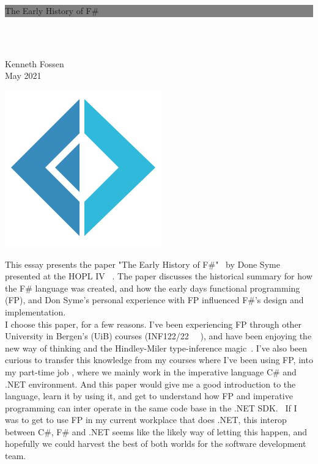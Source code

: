 \documentclass[12pt]{article}
\begin{document}
	\colorbox{grey}{
		\parbox[t]{0.93\textwidth}{ %
			\parbox[t]{0.91\textwidth}{ %
				\raggedleft %
				\fontsize{50pt}{80pt}\selectfont %
				\vspace{0.7cm} %
				
			    The Early History of F\#\\
			   
				\vspace{0.7cm} %
			}
		}
	}
\\\\
\parbox[t]{0.93\textwidth}{
    \raggedleft
    Kenneth Fossen\\
    May 2021
}


\includegraphics[scale=0.75]{img/fsharp256.png}

\vfil


This essay presents the paper "The Early History of F\#"~\cite{syme_early_2020} by Done Syme~\cite{noauthor_don_2021} presented at the HOPL IV ~\cite{noauthor_hopl_nodate}.
The paper discusses the historical summary for how the F\# language was created, and how the early days functional programming (FP), and Don Syme's personal experience with FP influenced F\#'s design and implementation.
\\

I choose this paper, for a few reasons. I've been experiencing FP through other University in Bergen's (UiB) courses (INF122/22 ~\cite{noauthor_funksjonell_nodate}~\cite{noauthor_programmeringssprak_nodate}), and have been enjoying the new way of thinking and the Hindley-Miler type-inference magic~\cite{noauthor_hindleymilner_2021}.
I've also been curious to transfer this knowledge from my courses where I've been using FP, into my part-time job , where we mainly work in the imperative language C\# and .NET environment. And this paper would give me a good introduction to the language, learn it by using it, and get to understand how FP and imperative programming can inter operate in the same code base in the .NET SDK.~\cite{dykstra_net_nodate}
If I was to get to use FP in my current workplace that does .NET, this interop between C\#, F\# and .NET seems like the likely way of letting this happen, and hopefully we could harvest the best of both worlds for the software development team.
 
\end{document}
